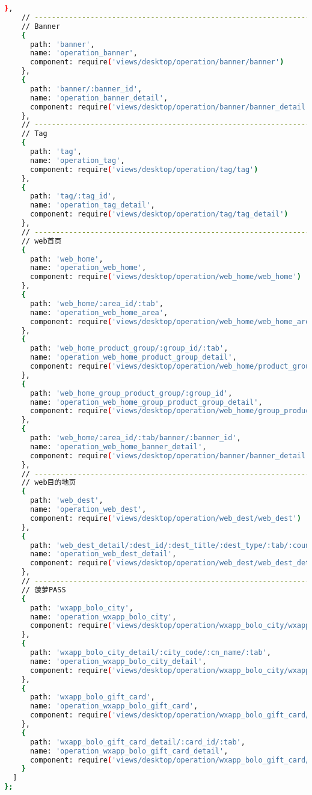 \begin{lstlisting}[language=bash]
    },
    // ----------------------------------------------------------------------------------------
    // Banner
    {
      path: 'banner',
      name: 'operation_banner',
      component: require('views/desktop/operation/banner/banner')
    },
    {
      path: 'banner/:banner_id',
      name: 'operation_banner_detail',
      component: require('views/desktop/operation/banner/banner_detail')
    },
    // ----------------------------------------------------------------------------------------
    // Tag
    {
      path: 'tag',
      name: 'operation_tag',
      component: require('views/desktop/operation/tag/tag')
    },
    {
      path: 'tag/:tag_id',
      name: 'operation_tag_detail',
      component: require('views/desktop/operation/tag/tag_detail')
    },
    // ----------------------------------------------------------------------------------------
    // web首页
    {
      path: 'web_home',
      name: 'operation_web_home',
      component: require('views/desktop/operation/web_home/web_home')
    },
    {
      path: 'web_home/:area_id/:tab',
      name: 'operation_web_home_area',
      component: require('views/desktop/operation/web_home/web_home_area')
    },
    {
      path: 'web_home_product_group/:group_id/:tab',
      name: 'operation_web_home_product_group_detail',
      component: require('views/desktop/operation/web_home/product_group_detail')
    },
    {
      path: 'web_home_group_product_group/:group_id',
      name: 'operation_web_home_group_product_group_detail',
      component: require('views/desktop/operation/web_home/group_product_group_detail')
    },
    {
      path: 'web_home/:area_id/:tab/banner/:banner_id',
      name: 'operation_web_home_banner_detail',
      component: require('views/desktop/operation/banner/banner_detail')
    },
    // ----------------------------------------------------------------------------------------
    // web目的地页
    {
      path: 'web_dest',
      name: 'operation_web_dest',
      component: require('views/desktop/operation/web_dest/web_dest')
    },
    {
      path: 'web_dest_detail/:dest_id/:dest_title/:dest_type/:tab/:country_code',
      name: 'operation_web_dest_detail',
      component: require('views/desktop/operation/web_dest/web_dest_detail')
    },
    // ----------------------------------------------------------------------------------------
    // 菠萝PASS
    {
      path: 'wxapp_bolo_city',
      name: 'operation_wxapp_bolo_city',
      component: require('views/desktop/operation/wxapp_bolo_city/wxapp_bolo_city')
    },
    {
      path: 'wxapp_bolo_city_detail/:city_code/:cn_name/:tab',
      name: 'operation_wxapp_bolo_city_detail',
      component: require('views/desktop/operation/wxapp_bolo_city/wxapp_bolo_city_detail')
    },
    {
      path: 'wxapp_bolo_gift_card',
      name: 'operation_wxapp_bolo_gift_card',
      component: require('views/desktop/operation/wxapp_bolo_gift_card/wxapp_bolo_gift_card')
    },
    {
      path: 'wxapp_bolo_gift_card_detail/:card_id/:tab',
      name: 'operation_wxapp_bolo_gift_card_detail',
      component: require('views/desktop/operation/wxapp_bolo_gift_card/wxapp_bolo_gift_card_detail')
    }
  ]
};
\end{lstlisting}



